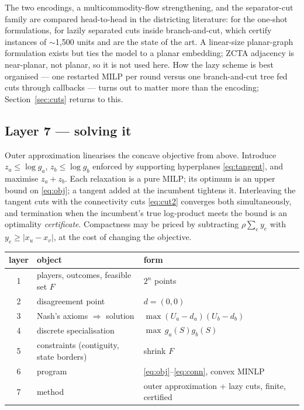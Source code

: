 \documentclass[11pt]{article}
\theoremstyle{remark}\newtheorem*{remark}{Remark}
\begin{document}
The two encodings, a multicommodity-flow strengthening, and the separator-cut family
are compared head-to-head in the districting literature: \citet{duque2011} for the
one-shot formulations, \citet{validi2021,validibuchanan2022} for lazily separated cuts
inside branch-and-cut, which certify instances of $\sim$1{,}500 units and are the state
of the art. A linear-size planar-graph formulation exists \citep{zhang2024} but ties the
model to a planar embedding; ZCTA adjacency is near-planar, not planar, so it is not
used here. How the lazy scheme is best organised --- one restarted MILP per round versus
one branch-and-cut tree fed cuts through callbacks \citep{quesada1992,bonami2008} ---
turns out to matter more than the encoding; Section~\ref{sec:cuts} returns to this.

\subsection{Layer 7 --- solving it}
Outer approximation linearises the concave objective from above. Introduce
$z_a\le\log g_a$, $z_b\le\log g_b$ enforced by supporting hyperplanes \eqref{eq:tangent},
and maximise $z_a+z_b$. Each relaxation is a pure MILP; its optimum is an upper bound on
\eqref{eq:obj}; a tangent added at the incumbent tightens it. Interleaving the tangent
cuts with the connectivity cuts \eqref{eq:cut2} converges both simultaneously, and
termination when the incumbent's true log-product meets the bound is an optimality
\emph{certificate}. Compactness may be priced by subtracting
$\rho\sum_{e}y_e$ with $y_e\ge|x_u-x_v|$, at the cost of changing the objective.

\begin{center}
\begin{tabular}{clll}
\toprule
\textbf{layer} & \textbf{object} & \textbf{form}\\
\midrule
1 & players, outcomes, feasible set $F$ & $2^n$ points\\
2 & disagreement point & $d=(0,0)$\\
3 & Nash's axioms $\Rightarrow$ solution & $\max(U_a-d_a)(U_b-d_b)$\\
4 & discrete specialisation & $\max\,g_a(S)g_b(S)$\\
5 & constraints (contiguity, state borders) & shrink $F$\\
6 & program & \eqref{eq:obj}--\eqref{eq:conn}, convex MINLP\\
7 & method & outer approximation + lazy cuts, finite, certified\\
\bottomrule
\end{tabular}
\end{center}
\end{document}
